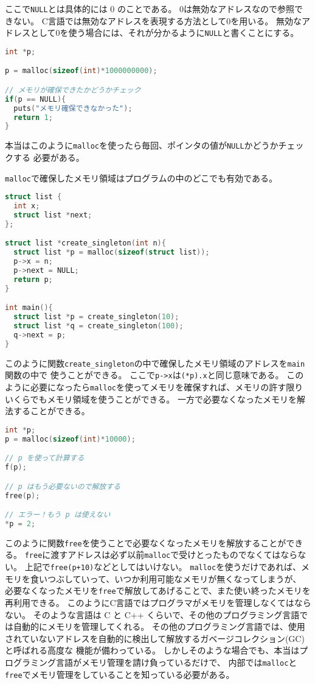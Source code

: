 \documentclass[a4paper,twoside,onecolumn,openany,article]{memoir}
\theoremstyle{remark}
\begin{document}
ここで\texttt{NULL}とは具体的には 0 のことである。
0は無効なアドレスなので参照できない。
C言語では無効なアドレスを表現する方法として0を用いる。
無効なアドレスとして0を使う場合には、それが分かるように\texttt{NULL}と書くことにする。
\begin{lstlisting}[basicstyle=\ttfamily\small,showstringspaces=false,language=C,frame=single]
int *p;

p = malloc(sizeof(int)*1000000000);

// メモリが確保できたかどうかチェック
if(p == NULL){
  puts("メモリ確保できなかった");
  return 1;
}

\end{lstlisting}
本当はこのように\texttt{malloc}を使ったら毎回、ポインタの値が\texttt{NULL}かどうかチェックする
必要がある。

\texttt{malloc}で確保したメモリ領域はプログラムの中のどこでも有効である。

\begin{lstlisting}[basicstyle=\ttfamily\small,showstringspaces=false,language=C,frame=single]
struct list {
  int x;
  struct list *next;
};

struct list *create_singleton(int n){
  struct list *p = malloc(sizeof(struct list));
  p->x = n;
  p->next = NULL;
  return p;
}

int main(){
  struct list *p = create_singleton(10);
  struct list *q = create_singleton(100);
  q->next = p;
}
\end{lstlisting}
このように関数\texttt{create\_singleton}の中で確保したメモリ領域のアドレスを\texttt{main}関数の中で
使うことができる。
ここで\texttt{p->x}は\texttt{(*p).x}と同じ意味である。
このように必要になったら\texttt{malloc}を使ってメモリを確保すれば、メモリの許す限りいくらでもメモリ領域を使うことができる。
一方で必要なくなったメモリを解法することができる。

\begin{lstlisting}[basicstyle=\ttfamily\small,showstringspaces=false,language=C,frame=single]
int *p;
p = malloc(sizeof(int)*10000);

// p を使って計算する
f(p);

// p はもう必要ないので解放する
free(p);

// エラー！もう p は使えない
*p = 2;
\end{lstlisting}
このように関数\texttt{free}を使うことで必要なくなったメモリを解放することができる。
\texttt{free}に渡すアドレスは必ず以前\texttt{malloc}で受けとったものでなくてはならない。
上記で\texttt{free(p+10)}などとしてはいけない。
\texttt{malloc}を使うだけであれば、メモリを食いつぶしていって、いつか利用可能なメモリが無くなってしまうが、
必要なくなったメモリを\texttt{free}で解放してあげることで、また使い終ったメモリを再利用できる。
このようにC言語ではプログラマがメモリを管理しなくてはならない。
そのような言語は C と C++ くらいで、その他のプログラミング言語では自動的にメモリを管理してくれる。
その他のプログラミング言語では、使用されていないアドレスを自動的に検出して解放するガベージコレクション(GC)と呼ばれる高度な
機能が備わっている。
しかしそのような場合でも、本当はプログラミング言語がメモリ管理を請け負っているだけで、
内部では\texttt{malloc}と\texttt{free}でメモリ管理をしていることを知っている必要がある。
\end{document}
